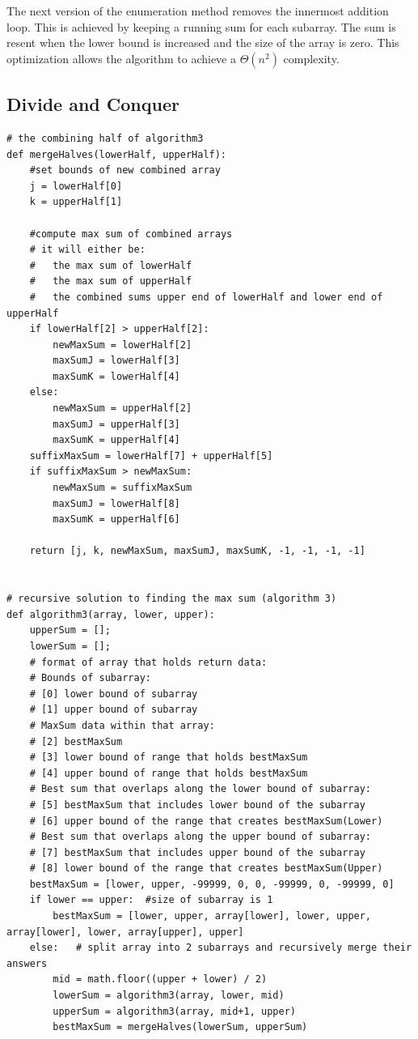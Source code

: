 \documentclass[letWterpaper,10pt,titlepage]{article}
\begin{document}
The next version of the enumeration method removes the innermost addition loop. This is achieved by keeping a running sum for each subarray. The sum is resent when the lower bound is increased and the size of the array is zero. This optimization allows the algorithm to achieve a $\Theta(n^2)$ complexity.

\subsection{Divide and Conquer}

\begin{lstlisting}
# the combining half of algorithm3
def mergeHalves(lowerHalf, upperHalf):
    #set bounds of new combined array
    j = lowerHalf[0]
    k = upperHalf[1]

    #compute max sum of combined arrays
    # it will either be:
    #   the max sum of lowerHalf
    #   the max sum of upperHalf
    #   the combined sums upper end of lowerHalf and lower end of upperHalf
    if lowerHalf[2] > upperHalf[2]:
        newMaxSum = lowerHalf[2]
        maxSumJ = lowerHalf[3]
        maxSumK = lowerHalf[4]
    else:
        newMaxSum = upperHalf[2]
        maxSumJ = upperHalf[3]
        maxSumK = upperHalf[4]
    suffixMaxSum = lowerHalf[7] + upperHalf[5]
    if suffixMaxSum > newMaxSum:
        newMaxSum = suffixMaxSum
        maxSumJ = lowerHalf[8]
        maxSumK = upperHalf[6]

    return [j, k, newMaxSum, maxSumJ, maxSumK, -1, -1, -1, -1]


# recursive solution to finding the max sum (algorithm 3)
def algorithm3(array, lower, upper):
    upperSum = [];
    lowerSum = [];
    # format of array that holds return data:
    # Bounds of subarray:
    # [0] lower bound of subarray
    # [1] upper bound of subarray
    # MaxSum data within that array:
    # [2] bestMaxSum
    # [3] lower bound of range that holds bestMaxSum
    # [4] upper bound of range that holds bestMaxSum
    # Best sum that overlaps along the lower bound of subarray:
    # [5] bestMaxSum that includes lower bound of the subarray
    # [6] upper bound of the range that creates bestMaxSum(Lower)
    # Best sum that overlaps along the upper bound of subarray:
    # [7] bestMaxSum that includes upper bound of the subarray
    # [8] lower bound of the range that creates bestMaxSum(Upper)
    bestMaxSum = [lower, upper, -99999, 0, 0, -99999, 0, -99999, 0]
    if lower == upper:  #size of subarray is 1
        bestMaxSum = [lower, upper, array[lower], lower, upper, array[lower], lower, array[upper], upper]
    else:   # split array into 2 subarrays and recursively merge their answers
        mid = math.floor((upper + lower) / 2)
        lowerSum = algorithm3(array, lower, mid)
        upperSum = algorithm3(array, mid+1, upper)
        bestMaxSum = mergeHalves(lowerSum, upperSum)



\end{lstlisting}
\end{document}
